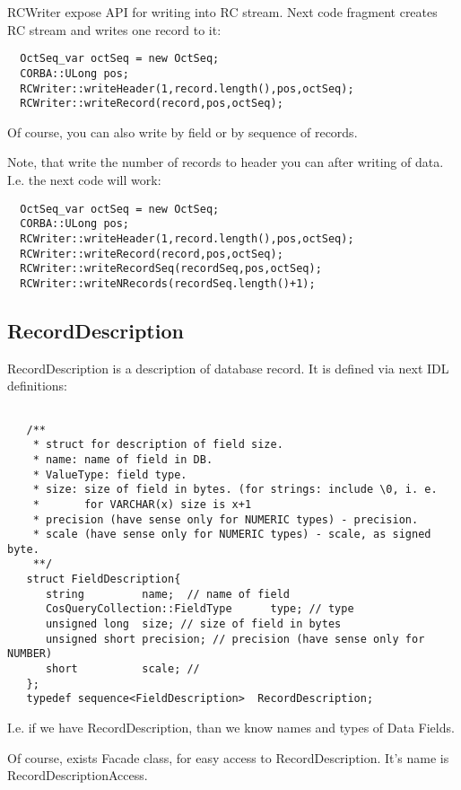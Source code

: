 \documentclass[10pt]{article}
\begin{document}
 RCWriter expose API for writing into RC stream. Next code fragment
 creates RC stream and writes one record to it:

\begin{verbatim}
  OctSeq_var octSeq = new OctSeq;
  CORBA::ULong pos;
  RCWriter::writeHeader(1,record.length(),pos,octSeq);
  RCWriter::writeRecord(record,pos,octSeq);
\end{verbatim}

 Of course, you can also write by field or by sequence of records.

 Note, that write the number of records to header you can after writing
of data. I.e. the next code will work:

\begin{verbatim}
  OctSeq_var octSeq = new OctSeq;
  CORBA::ULong pos;
  RCWriter::writeHeader(1,record.length(),pos,octSeq);
  RCWriter::writeRecord(record,pos,octSeq);
  RCWriter::writeRecordSeq(recordSeq,pos,octSeq);
  RCWriter::writeNRecords(recordSeq.length()+1);
\end{verbatim}


\subsection{ RecordDescription }

 RecordDescription is a description of database record. It is defined via next
IDL definitions:

\begin{verbatim}

   /**
    * struct for description of field size.
    * name: name of field in DB.
    * ValueType: field type.
    * size: size of field in bytes. (for strings: include \0, i. e. 
    *       for VARCHAR(x) size is x+1
    * precision (have sense only for NUMERIC types) - precision.
    * scale (have sense only for NUMERIC types) - scale, as signed byte.
    **/
   struct FieldDescription{
      string         name;  // name of field
      CosQueryCollection::FieldType      type; // type
      unsigned long  size; // size of field in bytes
      unsigned short precision; // precision (have sense only for NUMBER)
      short          scale; // 
   };
   typedef sequence<FieldDescription>  RecordDescription;

\end{verbatim}

 I.e. if we have RecordDescription, than we know names and types
 of Data Fields.

 Of course, exists Facade class, for easy access to RecordDescription.
 It's name is RecordDescriptionAccess.
\end{document}
